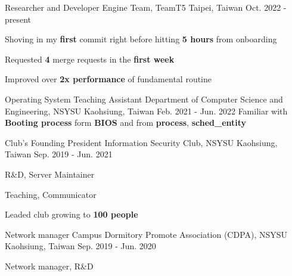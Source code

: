 
\begin{cventries}
  \cventry
  {Researcher and Developer} %
  {Engine Team, TeamT5} %
  {Taipei, Taiwan} %
  {Oct. 2022 - present} %
  {
    \begin{cvitems}
      \item {Shoving in my \textbf{first} commit right before hitting \textbf{5 hours} from onboarding}
      \item {Requested \textbf{4} merge requests in the \textbf{first week}}
      \item {Improved over \textbf{2x performance} of fundamental routine}
    \end{cvitems}
  }

  \cventry
  {Operating System Teaching Assistant} %
  {Department of Computer Science and Engineering, NSYSU} %
  {Kaohsiung, Taiwan} %
  {Feb. 2021 - Jun. 2022} %
  {Familiar with \textbf{Booting process} form \textbf{BIOS} and from \textbf{process}, \textbf{sched\_entity}}

  \cventry
  {Club's Founding President} %
  {Information Security Club, NSYSU} %
  {Kaohsiung, Taiwan} %
  {Sep. 2019 - Jun. 2021} %
  {
    \begin{cvitems} %
      \item {R\&D, Server Maintainer}
      \item {Teaching, Communicator}
      \item {Leaded club growing to \textbf{100 people}}
    \end{cvitems}
  }

  \cventry
  {Network manager} %
  {Campus Dormitory Promote Association (CDPA), NSYSU} %
  {Kaohsiung, Taiwan} %
  {Sep. 2019 - Jun. 2020} %
  {
    \begin{cvitems} %
      \item {Network manager, R\&D}
    \end{cvitems}
  }


\end{cventries}

